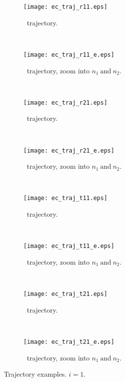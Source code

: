\begin{figure}
\vspace{-5mm}
\begin{subfigure}[t]{0.5\textwidth}
\centering
\texttt{[image: ec\_traj\_r11.eps]}
\caption[Extended coupling: \roo~trajectory.]{\roo~trajectory.}
\label{sf:ecr11}
\end{subfigure}
~
\begin{subfigure}[t]{0.5\textwidth}
\centering
\texttt{[image: ec\_traj\_r11\_e.eps]}
\caption[Extended coupling: \roo~trajectory, zoom into $ n_{1}~\text{and}~n_{2} $.]{\roo~trajectory, zoom into $ n_{1}~\text{and}~n_{2} $.}
\label{sf:ecr11e}
\end{subfigure}
\\[-1mm]
\begin{subfigure}[t]{0.5\textwidth}
\centering
\texttt{[image: ec\_traj\_r21.eps]}
\caption[Extended coupling: \rto~trajectory.]{\rto~trajectory.}
\label{sf:ecr21}
\end{subfigure}
~
\begin{subfigure}[t]{0.5\textwidth}
\centering
\texttt{[image: ec\_traj\_r21\_e.eps]}
\caption[Extended coupling: \rto~trajectory, zoom into $ n_{1}~\text{and}~n_{2} $.]{\rto~trajectory, zoom into $ n_{1}~\text{and}~n_{2} $.}
\label{sf:ecr21e}
\end{subfigure}
\\[-1mm]
\begin{subfigure}[t]{0.5\textwidth}
\centering
\texttt{[image: ec\_traj\_t11.eps]}
\caption[Extended coupling: \too~trajectory.]{\too~trajectory.}
\label{sf:ect11}
\end{subfigure}
~
\begin{subfigure}[t]{0.5\textwidth}
\centering
\texttt{[image: ec\_traj\_t11\_e.eps]}
\caption[Extended coupling: \too~trajectory, zoom into $ n_{1}~\text{and}~n_{2} $.]{\too~trajectory, zoom into $ n_{1}~\text{and}~n_{2} $.}
\label{sf:ect11e}
\end{subfigure}
\\[-1mm]
\begin{subfigure}[t]{0.5\textwidth}
\centering
\texttt{[image: ec\_traj\_t21.eps]}
\caption[Extended coupling: \tto~trajectory.]{\tto~trajectory.}
\label{sf:ect21}
\end{subfigure}
~
\begin{subfigure}[t]{0.5\textwidth}
\centering
\texttt{[image: ec\_traj\_t21\_e.eps]}
\caption[Extended coupling: \tto~trajectory, zoom into $ n_{1}~\text{and}~n_{2} $.]{\tto~trajectory, zoom into $ n_{1}~\text{and}~n_{2} $.}
\label{sf:ect21e}
\end{subfigure}
\vspace{-3mm}
\caption[Extended coupling: trajectory examples. $ i = 1 $.]{Trajectory examples. $ i = 1 $.}
\label{f:ec1t}
\end{figure}

